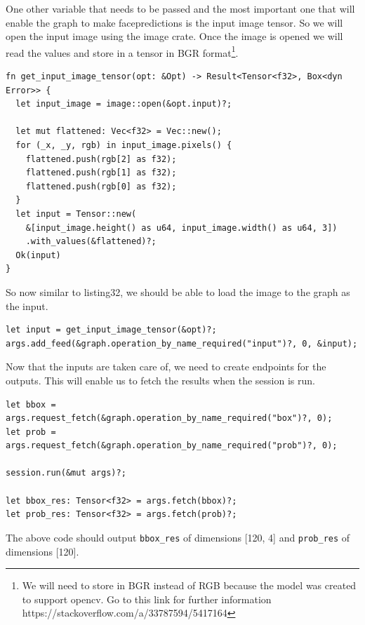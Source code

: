 \documentclass{book}
\begin{document}
One other variable that needs to be passed and the most important one that will enable the graph to make facepredictions is the input image tensor. So we will open the input image using the image crate. Once the image is opened we will read the values and store in a tensor in BGR format\footnote{We will need to store in BGR instead of RGB because the model was created to support opencv. Go to this link for further information https://stackoverflow.com/a/33787594/5417164}.

\begin{lstlisting}[caption={chapter6/face-detection-tf/src/main.rs}, basicstyle=\small]
fn get_input_image_tensor(opt: &Opt) -> Result<Tensor<f32>, Box<dyn Error>> {
  let input_image = image::open(&opt.input)?;

  let mut flattened: Vec<f32> = Vec::new();
  for (_x, _y, rgb) in input_image.pixels() {
    flattened.push(rgb[2] as f32);
    flattened.push(rgb[1] as f32);
    flattened.push(rgb[0] as f32);
  }
  let input = Tensor::new(
    &[input_image.height() as u64, input_image.width() as u64, 3])
    .with_values(&flattened)?;
  Ok(input)
}
\end{lstlisting}

So now similar to listing32, we should be able to load the image to the graph as the input.

\begin{lstlisting}[caption={chapter6/face-detection-tf/src/main.rs}, basicstyle=\small]
let input = get_input_image_tensor(&opt)?;
args.add_feed(&graph.operation_by_name_required("input")?, 0, &input);
\end{lstlisting}

Now that the inputs are taken care of, we need to create endpoints for the outputs. This will enable us to fetch the results when the session is run.

\begin{lstlisting}[caption={chapter6/face-detection-tf/src/main.rs}, basicstyle=\small]
let bbox = args.request_fetch(&graph.operation_by_name_required("box")?, 0);
let prob = args.request_fetch(&graph.operation_by_name_required("prob")?, 0);

session.run(&mut args)?;

let bbox_res: Tensor<f32> = args.fetch(bbox)?;
let prob_res: Tensor<f32> = args.fetch(prob)?;
\end{lstlisting}

The above code should output \lstinline{bbox_res} of dimensions [120, 4] and \lstinline{prob_res} of dimensions [120].
\end{document}
